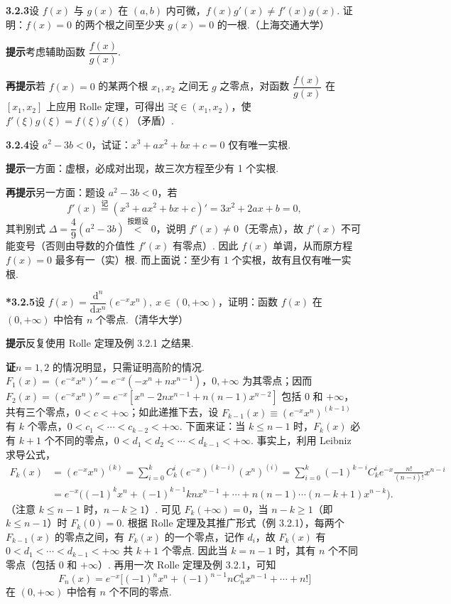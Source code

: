 \documentclass[UTF8,12pt,a4paper,fontset=fandol]{ctexart}
\begin{document}
\noindent\textbf{3.2.3}\quad 设 $f(x)$ 与 $g(x)$ 在 $(a,b)$ 内可微，$f(x)g'(x)\ne f'(x)g(x)$. 证明：$f(x)=0$ 的两个根之间至少夹 $g(x)=0$ 的一根.（上海交通大学）

\noindent\textbf{提示}\quad 考虑辅助函数 $\dfrac{f(x)}{g(x)}$.

\noindent\textbf{再提示}\quad 若 $f(x)=0$ 的某两个根 $x_1,x_2$ 之间无 $g$ 之零点，对函数 $\dfrac{f(x)}{g(x)}$ 在 $[x_1,x_2]$ 上应用 Rolle 定理，可得出 $\exists \xi\in(x_1,x_2)$，使 $f'(\xi)g(\xi)=f(\xi)g'(\xi)$（矛盾）.

\noindent\textbf{3.2.4}\quad 设 $a^2-3b<0$，试证：$x^3+ax^2+bx+c=0$ 仅有唯一实根.

\noindent\textbf{提示}\quad 一方面：虚根，必成对出现，故三次方程至少有 1 个实根.

\noindent\textbf{再提示}\quad 另一方面：题设 $a^2-3b<0$，若
\[
  f'(x)\overset{\text{记}}{=}(x^3+ax^2+bx+c)'=3x^2+2ax+b=0,
\]
其判别式 $\Delta=\dfrac49(a^2-3b)\overset{\text{按题设}}{<}0$，说明 $f'(x)\ne0$（无零点），故 $f'(x)$ 不可能变号（否则由导数的介值性 $f'(x)$ 有零点）. 因此 $f(x)$ 单调，从而原方程 $f(x)=0$ 最多有一（实）根. 而上面说：至少有 1 个实根，故有且仅有唯一实根.

\noindent\textbf{*3.2.5}\quad 设 $f(x)=\dfrac{\mathrm d^n}{\mathrm dx^n}(e^{-x}x^n),\ x\in(0,+\infty)$，证明：函数 $f(x)$ 在 $(0,+\infty)$ 中恰有 $n$ 个零点.（清华大学）

\noindent\textbf{提示}\quad 反复使用 Rolle 定理及例 3.2.1 之结果.

\noindent\textbf{证}\quad $n=1,2$ 的情况明显，只需证明高阶的情况. $F_1(x)=(e^{-x}x^n)'=e^{-x}(-x^n+nx^{n-1})$，$0,+\infty$ 为其零点；因而 $F_2(x)=(e^{-x}x^n)''=e^{-x}[x^n-2nx^{n-1}+n(n-1)x^{n-2}]$ 包括 0 和 $+\infty$，共有三个零点，$0<c<+\infty$；如此递推下去，设 $F_{k-1}(x)\equiv(e^{-x}x^n)^{(k-1)}$ 有 $k$ 个零点，$0<c_1<\cdots<c_{k-2}<+\infty$. 下面来证：当 $k\le n-1$ 时，$F_k(x)$ 必有 $k+1$ 个不同的零点，$0<d_1<d_2<\cdots<d_{k-1}<+\infty$. 事实上，利用 Leibniz 求导公式，
\[
\begin{aligned}
F_k(x)
&=(e^{-x}x^n)^{(k)}
=\sum_{i=0}^k C_k^i(e^{-x})^{(k-i)}(x^n)^{(i)}
=\sum_{i=0}^k(-1)^{k-i}C_k^i e^{-x}\frac{n!}{(n-i)!}x^{n-i}\\
&=e^{-x}\bigl((-1)^k x^n+(-1)^{k-1}knx^{n-1}+\cdots+n(n-1)\cdots(n-k+1)x^{n-k}\bigr).
\end{aligned}
\]
（注意 $k\le n-1$ 时，$n-k\ge1$）. 可见 $F_k(+\infty)=0$，当 $n-k\ge1$（即 $k\le n-1$）时 $F_k(0)=0$. 根据 Rolle 定理及其推广形式（例 3.2.1），每两个 $F_{k-1}(x)$ 的零点之间，有 $F_k(x)$ 的一个零点，记作 $d_i$，故 $F_k(x)$ 有 $0<d_1<\cdots<d_{k-1}<+\infty$ 共 $k+1$ 个零点. 因此当 $k=n-1$ 时，其有 $n$ 个不同零点（包括 0 和 $+\infty$）. 再用一次 Rolle 定理及例 3.2.1，可知
\[
  F_n(x)=e^{-x}\bigl[(-1)^n x^n+(-1)^{n-1}nC_n^1x^{n-1}+\cdots+n!\bigr]
\]
在 $(0,+\infty)$ 中恰有 $n$ 个不同的零点.
\end{document}
